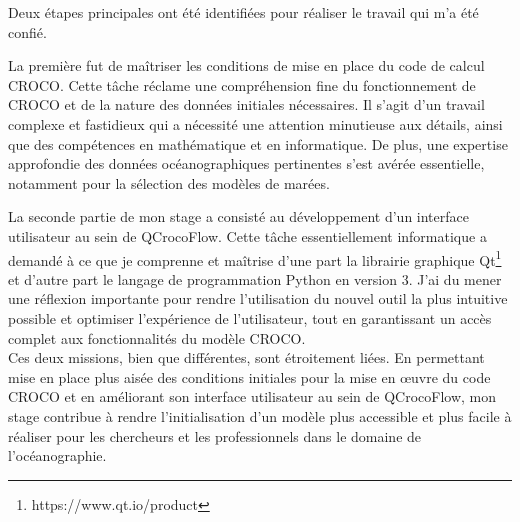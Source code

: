 Deux étapes principales ont été identifiées pour réaliser le travail qui m'a été confié.

La première fut de maîtriser les conditions de mise en place du code de calcul CROCO. Cette tâche réclame une compréhension fine du fonctionnement de CROCO et de la nature des données initiales nécessaires. Il s'agit d'un travail complexe et fastidieux qui a nécessité une attention minutieuse aux détails, ainsi que des compétences en mathématique et en informatique. De plus, une expertise approfondie des données océanographiques pertinentes s'est avérée essentielle, notamment pour la sélection des modèles de marées.

La seconde partie de mon stage a consisté au développement d'un interface utilisateur au sein de QCrocoFlow. Cette tâche essentiellement informatique a demandé à ce que je comprenne et maîtrise d'une part la librairie graphique Qt\footnote{https://www.qt.io/product} et d'autre part le langage de programmation Python en version 3. J'ai du mener une réflexion importante pour rendre l'utilisation du nouvel outil la plus intuitive possible et optimiser l'expérience de l'utilisateur, tout en garantissant un accès complet aux fonctionnalités du modèle CROCO.\\

Ces deux missions, bien que différentes, sont étroitement liées. En permettant mise en place plus aisée des conditions initiales pour la mise en \oe{uvre} du code CROCO et en améliorant son interface utilisateur au sein de QCrocoFlow, mon stage contribue à rendre l'initialisation d'un modèle plus accessible et plus facile à réaliser pour les chercheurs et les professionnels dans le domaine de l'océanographie.

